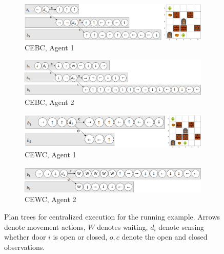 \documentclass[letterpaper]{article} %
\begin{document}
\begin{figure}[t]
    \begin{subfigure}[b]{0.4\textwidth}
      \includegraphics[scale=.25]{Figures/CEBC1+example.png}
      \caption{CEBC, Agent 1}\label{fig:CEBC1}
    \end{subfigure}
    \begin{subfigure}[b]{0.4\textwidth}
      \includegraphics[scale=.25]{Figures/CEBC2.png}
      \caption{CEBC, Agent 2}\label{fig:CEBC2}
    \end{subfigure}

    \begin{subfigure}[b]{0.4\textwidth}
      \includegraphics[scale=.25]{Figures/CEWC1+example.png}
      \caption{CEWC, Agent 1}\label{fig:CEWC1}
    \end{subfigure}
    \begin{subfigure}[b]{0.4\textwidth}
      \includegraphics[scale=.25]{Figures/CEWC2.png}
      \caption{CEWC, Agent 2}\label{fig:CEWC2}
    \end{subfigure}
    \caption{Plan trees for centralized execution for the running example. Arrows denote movement actions, $W$ denotes waiting, $d_i$ denote sensing whether door $i$ is open or closed, $o,c$ denote the open and closed observations.}

\end{figure}
\end{document}
